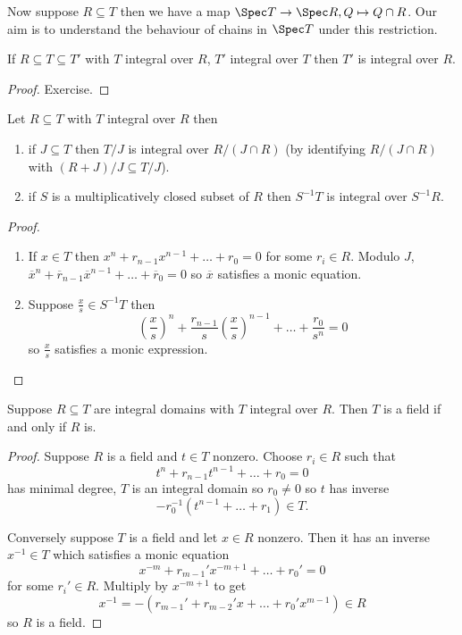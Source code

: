 \documentclass[a4paper]{article}
\begin{document}
Now suppose \(R \subseteq T\) then we have a map \(\Spec T \to \Spec R, Q \mapsto Q \cap R\). Our aim is to understand the behaviour of chains in \(\Spec T\) under this restriction.

\begin{lemma}
  If \(R \subseteq T \subseteq T'\) with \(T\) integral over \(R\), \(T'\) integral over \(T\) then \(T'\) is integral over \(R\).
\end{lemma}

\begin{proof}
  Exercise.
\end{proof}

\begin{lemma}
  Let \(R \subseteq T\) with \(T\) integral over \(R\) then
  \begin{enumerate}
  \item if \(J \subseteq T\) then \(T/J\) is integral over \(R/(J \cap R)\) (by identifying \(R/(J \cap R)\) with \((R + J)/J \subseteq T/J\)).
  \item if \(S\) is a multiplicatively closed subset of \(R\) then \(S^{-1}T\) is integral over \(S^{-1}R\).
  \end{enumerate}
\end{lemma}

\begin{proof}\leavevmode
  \begin{enumerate}
  \item If \(x \in T\) then \(x^n + r_{n - 1}x^{n - 1} + \dots + r_0 = 0\) for some \(r_i \in R\). Modulo \(J\), \(\overline x^n + \overline r_{n - 1} \overline x^{n - 1} + \dots + \overline r_0 = 0\) so \(\overline x\) satisfies a monic equation.
  \item Suppose \(\frac{x}{s} \in S^{-1}T\) then
    \[
      \left( \frac{x}{s} \right)^n + \frac{r_{n - 1}}{s} \left( \frac{x}{s} \right)^{n - 1} + \dots + \frac{r_0}{s^n} = 0
    \]
    so \(\frac{x}{s}\) satisfies a monic expression.
  \end{enumerate}
\end{proof}

\begin{lemma}
  Suppose \(R \subseteq T\) are integral domains with \(T\) integral over \(R\). Then \(T\) is a field if and only if \(R\) is.
\end{lemma}

\begin{proof}
  Suppose \(R\) is a field and \(t \in T\) nonzero. Choose \(r_i \in R\) such that
  \[
    t^n + r_{n - 1}t^{n - 1} + \dots + r_0 = 0
  \]
  has minimal degree, \(T\) is an integral domain so \(r_0 \neq 0\) so \(t\) has inverse
  \[
    -r_0^{-1}(t^{n - 1} + \dots + r_1) \in T.
  \]

  Conversely suppose \(T\) is a field and let \(x \in R\) nonzero. Then it has an inverse \(x^{-1} \in T\) which satisfies a monic equation
  \[
    x^{-m} + r_{m - 1}' x^{-m + 1} + \dots + r_0' = 0
  \]
  for some \(r_i' \in R\). Multiply by \(x^{-m + 1}\) to get
  \[
    x^{-1} = -(r_{m - 1}' + r_{m - 2}' x + \dots + r_0' x^{m - 1}) \in R
  \]
  so \(R\) is a field.
\end{proof}
\end{document}

